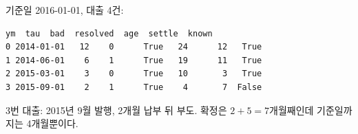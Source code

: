 \begin{workout}
기준일 2016-01-01, 대출 4건:
\begin{lstlisting}[style=out]
          ym  tau  bad  resolved  age  settle  known
0 2014-01-01   12    0      True   24      12   True
1 2014-06-01    6    1      True   19      11   True
2 2015-03-01    3    0      True   10       3   True
3 2015-09-01    2    1      True    4       7  False
\end{lstlisting}
 3번 대출: 2015년 9월 발행, 2개월 납부 뒤 부도. 확정은 $2+5=7$개월째인데 기준일까지는 4개월뿐이다.
\end{workout}

